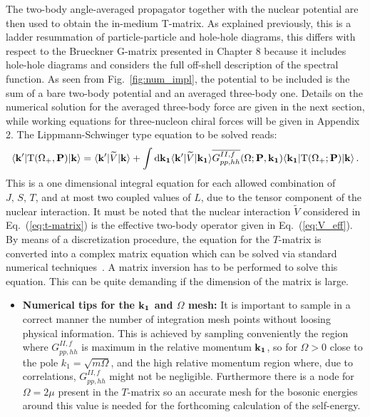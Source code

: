  The two-body angle-averaged propagator together with the nuclear potential are then used to obtain the in-medium T-matrix. As explained previously, this is a ladder resummation of particle-particle and hole-hole diagrams, this differs with respect to the Brueckner G-matrix presented in Chapter 8 because it includes hole-hole diagrams and considers the full off-shell description of the spectral function. As seen from Fig.~\ref{fig:num_impl}, the potential to be included is the sum of a bare two-body potential and an averaged three-body one. Details on the numerical solution for the averaged three-body force are given in the next section, while working equations for three-nucleon chiral forces will be given in Appendix 2. The Lippmann-Schwinger type equation to be solved reads:
\begin{equation}
\label{eq:t-matrix}
\langle{\bf k'}|{\rm T}(\Omega_+,{\bf P})|{\bf k}\rangle=\langle{\bf k'}|\widetilde V|{\bf k}\rangle+\int {\rm d}{\bf k_1}\langle{\bf k'}|\widetilde V|{\bf k_1}\rangle\overline{G^{II,f}_{pp,hh}}(\Omega;{\bf P},{\bf k_1})\langle{\bf k_1}|{\rm T}(\Omega_+;{\bf P})|{\bf k}\rangle\,.
\end{equation}
This is a one dimensional integral equation for each allowed combination of $J,\,S,\,T$, and at most two coupled values of $L$, due to the tensor component of the nuclear interaction. It must be noted that the nuclear interaction $\widetilde V$ considered in Eq.~(\ref{eq:t-matrix}) is the effective two-body operator given in Eq.~(\ref{eq:V_eff}). By means of a discretization procedure, the equation for the $T$-matrix is converted into a complex matrix equation which can be solved via standard numerical techniques~\cite{ch11_Rios2007PhD}. A matrix inversion has to be performed to solve this equation. This can be quite demanding if the dimension of the matrix is large. 
\begin{itemize}
\item {\bf Numerical tips for the ${\bf k_1}$ and $\Omega$ mesh:} It is important to sample in a correct manner the number of integration mesh points without loosing physical information. This is achieved by sampling conveniently the region where $G^{II,f}_{pp,hh}$ is maximum in the relative momentum ${\bf k_1}$, so for $\Omega>0$ close to the pole $k_1=\sqrt{m\Omega}$, and the high relative momentum region where, due to correlations, $G^{II,f}_{pp,hh}$ might not be negligible. Furthermore there is a node for $\Omega=2\mu$ present in the $T$-matrix so an accurate mesh for the bosonic energies around this value is needed for the forthcoming calculation of the self-energy.
\end{itemize}
